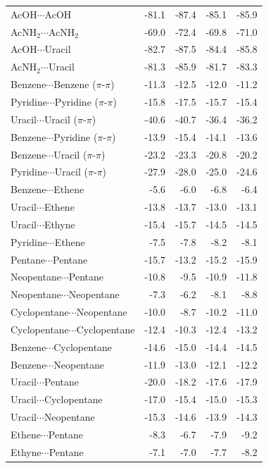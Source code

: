 \begin{longtable}{lrrrr}
AcOH$\cdots$AcOH & -81.1 & -87.4 & -85.1 & -85.9 \\
AcNH$_2$$\cdots$AcNH$_2$ & -69.0 & -72.4 & -69.8 & -71.0 \\
AcOH$\cdots$Uracil & -82.7 & -87.5 & -84.4 & -85.8 \\
AcNH$_2$$\cdots$Uracil & -81.3 & -85.9 & -81.7 & -83.3 \\
Benzene$\cdots$Benzene ($\pi$-$\pi$) & -11.3 & -12.5 & -12.0 & -11.2 \\
Pyridine$\cdots$Pyridine ($\pi$-$\pi$) & -15.8 & -17.5 & -15.7 & -15.4 \\
Uracil$\cdots$Uracil ($\pi$-$\pi$) & -40.6 & -40.7 & -36.4 & -36.2 \\
Benzene$\cdots$Pyridine ($\pi$-$\pi$) & -13.9 & -15.4 & -14.1 & -13.6 \\
Benzene$\cdots$Uracil ($\pi$-$\pi$) & -23.2 & -23.3 & -20.8 & -20.2 \\
Pyridine$\cdots$Uracil ($\pi$-$\pi$) & -27.9 & -28.0 & -25.0 & -24.6 \\
Benzene$\cdots$Ethene & -5.6 & -6.0 & -6.8 & -6.4 \\
Uracil$\cdots$Ethene & -13.8 & -13.7 & -13.0 & -13.1 \\
Uracil$\cdots$Ethyne & -15.4 & -15.7 & -14.5 & -14.5 \\
Pyridine$\cdots$Ethene & -7.5 & -7.8 & -8.2 & -8.1 \\
Pentane$\cdots$Pentane & -15.7 & -13.2 & -15.2 & -15.9 \\
Neopentane$\cdots$Pentane & -10.8 & -9.5 & -10.9 & -11.8 \\
Neopentane$\cdots$Neopentane & -7.3 & -6.2 & -8.1 & -8.8 \\
Cyclopentane$\cdots$Neopentane & -10.0 & -8.7 & -10.2 & -11.0 \\
Cyclopentane$\cdots$Cyclopentane & -12.4 & -10.3 & -12.4 & -13.2 \\
Benzene$\cdots$Cyclopentane & -14.6 & -15.0 & -14.4 & -14.5 \\
Benzene$\cdots$Neopentane & -11.9 & -13.0 & -12.1 & -12.2 \\
Uracil$\cdots$Pentane & -20.0 & -18.2 & -17.6 & -17.9 \\
Uracil$\cdots$Cyclopentane & -17.0 & -15.4 & -15.0 & -15.3 \\
Uracil$\cdots$Neopentane & -15.3 & -14.6 & -13.9 & -14.3 \\
Ethene$\cdots$Pentane & -8.3 & -6.7 & -7.9 & -9.2 \\
Ethyne$\cdots$Pentane & -7.1 & -7.0 & -7.7 & -8.2 \\

\end{longtable}

